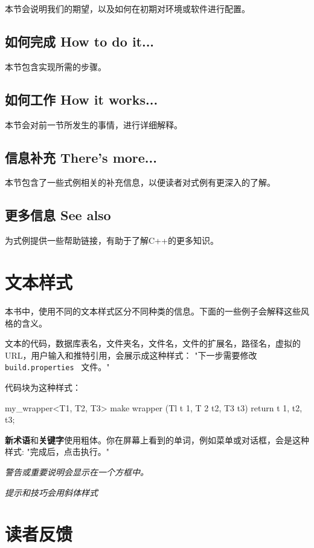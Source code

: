 本节会说明我们的期望，以及如何在初期对环境或软件进行配置。

\subsection{如何完成 How to do it...}

本节包含实现所需的步骤。

\subsection{如何工作 How it works...}

本节会对前一节所发生的事情，进行详细解释。

\subsection{信息补充 There's more...}

本节包含了一些式例相关的补充信息，以便读者对式例有更深入的了解。

\subsection{更多信息 See also}

为式例提供一些帮助链接，有助于了解C++的更多知识。

\section{文本样式}

本书中，使用不同的文本样式区分不同种类的信息。下面的一些例子会解释这些风格的含义。

文本的代码，数据库表名，文件夹名，文件名，文件的扩展名，路径名，虚拟的URL，用户输入和推特引用，会展示成这种样式： "下一步需要修改\texttt{build.properties } 文件。"

代码块为这种样式：

\begin{codebox}[cpp]
my_wrapper<T1, T2, T3> make wrapper (Tl t 1, T 2 t2, T3 t3) 
{
  return t 1, t2, t3;
}
\end{codebox}

\textbf{新术语}和\textbf{关键字}使用粗体。你在屏幕上看到的单词，例如菜单或对话框，会是这种样式: "完成后，点击执行。"

\emph{警告或重要说明会显示在一个方框中。}

\emph{提示和技巧会用斜体样式}

\section{读者反馈}


